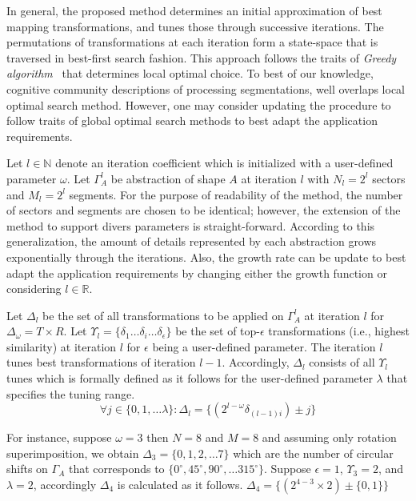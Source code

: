 In general, the proposed method determines an initial approximation of best mapping transformations, and tunes those through successive iterations. The permutations of transformations at each iteration form a state-space that is traversed in best-first search fashion. This approach follows the traits of \textit{Greedy algorithm}~\cite{cormen2009introduction} that determines local optimal choice. To best of our knowledge, cognitive community descriptions of processing segmentations, well overlaps local optimal search method. However, one may consider updating the procedure to follow traits of global optimal search methods to best adapt the application requirements.

Let $l \in \mathbb{N}$ denote an iteration coefficient which is initialized with a user-defined parameter $\omega$. Let $\Gamma_A^l$ be abstraction of shape $A$ at iteration $l$ with $N_l = 2^l$ sectors and $M_l=2^l$ segments. For the purpose of readability of the method, the number of sectors and segments are chosen to be identical; however, the extension of the method to support divers parameters is straight-forward. According to this generalization, the amount of details represented by each abstraction grows exponentially through the iterations. Also, the growth rate can be update to best adapt the application requirements by changing either the growth function or considering $l\in \mathbb{R}$.

Let $\Delta_l$ be the set of all transformations to be applied on $\Gamma_A^l$ at iteration $l$ for $\Delta_\omega = T \times R$. Let $\Upsilon_l = \{\delta_1 \dots \delta_i \dots \delta_\epsilon \}$ be the set of top-$\epsilon$ transformations (i.e., highest similarity) at iteration $l$ for $\epsilon$ being a user-defined parameter. The iteration $l$ tunes best transformations of iteration $l-1$. Accordingly, $\Delta_l$ consists of all $\Upsilon_l$ tunes which is formally defined as it follows for the user-defined parameter $\lambda$ that specifies the tuning range. 
\begin{equation}
\forall j \in \{0, 1, \dots \lambda\} \colon \Delta_l = \{(2^{l-\omega} \delta_{(l-1)i} ) \pm j \}
\end{equation}

For instance, suppose $\omega=3$ then $N=8$ and $M=8$ and assuming only rotation superimposition, we obtain $\Delta_3 = \{0,1,2, \dots 7\}$ which are the number of circular shifts on $\Gamma_A$ that corresponds to $\{0^\circ, 45^\circ, 90^\circ, \dots 315^\circ\}$. Suppose $\epsilon=1$, $\Upsilon_3={2}$, and $\lambda=2$, accordingly $\Delta_4$ is calculated as it follows.
$\Delta_4=\{(2^{4-3} \times 2) \pm \{0, 1\}\}$

